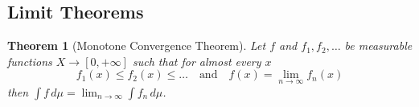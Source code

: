 \documentclass[11pt]{article}
\newcommand{\dm}{\ensuremath{\,d\mu}}
\newtheorem{theorem}{Theorem}[section]
\begin{document}
\subsection{Limit Theorems}
\begin{theorem}[Monotone Convergence Theorem]
Let $f$ and $f_1, f_2, \dots$ be measurable functions $X\to[0, +\infty]$ such that for almost every $x$
\[
	f_1(x)\leq f_2(x)\leq \dots \quad \text{and} \quad f(x)=\lim_{n\to\infty}f_n(x)
\]
then $\int f\dm = \lim_{n\to\infty}\int f_n \dm$.
\end{theorem}
\end{document}
